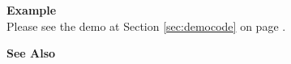 \noindent
{\bf Example}\\
Please see the demo at Section \ref{sec:democode} on page \pageref{sec:democode}.\\
\noindent

\noindent
{\bf See Also}\\

